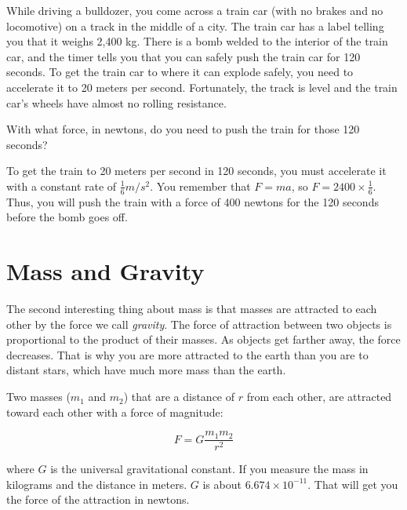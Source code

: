 \begin{Exercise}[title={Acceleration}, label=acceleration_train]
  
While driving a bulldozer, you come across a train car (with no brakes
and no locomotive) on a track in the middle of a city. The train car
has a label telling you that it weighs 2,400 kg. There is a bomb
welded to the interior of the train car, and the timer tells you that
you can safely push the train car for 120 seconds. To get the train
car to where it can explode safely, you need to accelerate it to 20 meters per
second. Fortunately, the track is level and the train car's wheels have
almost no rolling resistance.

With what force, in newtons, do you need to push the train for those 120 seconds?

\end{Exercise}
\begin{Answer}[ref=acceleration_train]
To get the train to 20 meters per second in 120 seconds, you must
accelerate it with a constant rate of $\frac{1}{6} m/s^2$. You
remember that $F = m a$, so $F = 2400 \times \frac{1}{6}$. Thus, you
will push the train with a force of 400 newtons for the 120 seconds
before the bomb goes off.
\end{Answer}

\section{Mass and Gravity}

The second interesting thing about mass is that masses are
attracted to each other by the force we call \textit{gravity}. The
force of attraction between two objects is proportional to the product
of their masses. As objects get farther away, the force decreases.
That is why you are more attracted to the earth than you are to
distant stars, which have much more mass than the earth.

\begin{mdframed}[style=important, frametitle={Newton's Law of Universal Gravitation}]

Two masses ($m_1$ and $m_2$) that are a distance of
$r$ from each other, are attracted toward each other with a force of
magnitude:

$$F = G\frac{m_1 m_2}{r^2}$$

where $G$ is the universal gravitational constant. If you measure the
mass in kilograms and the distance in meters. $G$ is about $6.674
\times 10^{-11}$.  That will get you the force of the attraction in
newtons.

\end{mdframed}

